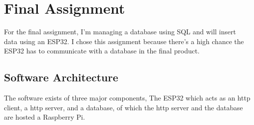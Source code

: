\section{Final Assignment}
For the final assignment, I'm managing a database using SQL and will insert data using an ESP32.
I chose this assignment because there's a high chance the ESP32 has to communicate with a database in the final product.

\subsection{Software Architecture}
The software exists of three major components, The ESP32 which acts as an \gls{http} client, a \gls{http} server, and a database, of which the \gls{http} server and the database are hosted a Raspberry Pi.

